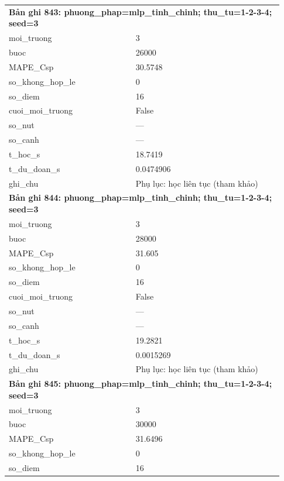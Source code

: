 \begin{longtable}{p{0.43\linewidth}p{0.50\linewidth}}
\midrule
\multicolumn{2}{p{0.95\linewidth}}{\textbf{Bản ghi 843: phuong\_phap=mlp\_tinh\_chinh; thu\_tu=1-2-3-4; seed=3}} \\
moi\_\allowbreak truong & 3 \\
buoc & 26000 \\
MAPE\_\allowbreak Csp & 30.5748 \\
so\_\allowbreak khong\_\allowbreak hop\_\allowbreak le & 0 \\
so\_\allowbreak diem & 16 \\
cuoi\_\allowbreak moi\_\allowbreak truong & False \\
so\_\allowbreak nut & — \\
so\_\allowbreak canh & — \\
t\_\allowbreak hoc\_\allowbreak s & 18.7419 \\
t\_\allowbreak du\_\allowbreak doan\_\allowbreak s & 0.0474906 \\
ghi\_\allowbreak chu & Phụ lục: học liên tục (tham khảo) \\
\midrule
\multicolumn{2}{p{0.95\linewidth}}{\textbf{Bản ghi 844: phuong\_phap=mlp\_tinh\_chinh; thu\_tu=1-2-3-4; seed=3}} \\
moi\_\allowbreak truong & 3 \\
buoc & 28000 \\
MAPE\_\allowbreak Csp & 31.605 \\
so\_\allowbreak khong\_\allowbreak hop\_\allowbreak le & 0 \\
so\_\allowbreak diem & 16 \\
cuoi\_\allowbreak moi\_\allowbreak truong & False \\
so\_\allowbreak nut & — \\
so\_\allowbreak canh & — \\
t\_\allowbreak hoc\_\allowbreak s & 19.2821 \\
t\_\allowbreak du\_\allowbreak doan\_\allowbreak s & 0.0015269 \\
ghi\_\allowbreak chu & Phụ lục: học liên tục (tham khảo) \\
\midrule
\multicolumn{2}{p{0.95\linewidth}}{\textbf{Bản ghi 845: phuong\_phap=mlp\_tinh\_chinh; thu\_tu=1-2-3-4; seed=3}} \\
moi\_\allowbreak truong & 3 \\
buoc & 30000 \\
MAPE\_\allowbreak Csp & 31.6496 \\
so\_\allowbreak khong\_\allowbreak hop\_\allowbreak le & 0 \\
so\_\allowbreak diem & 16 \\

\end{longtable}
